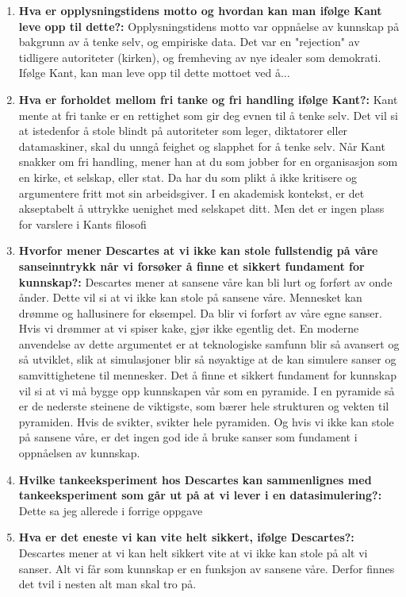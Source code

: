 \documentclass[11pt]{article}
\begin{document}
\begin{enumerate}
    \item \textbf{Hva er opplysningstidens motto og hvordan kan man ifølge Kant leve opp til dette?:} Opplysningstidens motto var oppnåelse av kunnskap på bakgrunn av å tenke selv, og empiriske data. Det var en "rejection" av tidligere autoriteter (kirken), og fremheving av nye idealer som demokrati. Ifølge Kant, kan man leve opp til dette mottoet ved å...
    \item \textbf{Hva er forholdet mellom fri tanke og fri handling ifølge Kant?:} Kant mente at fri tanke er en rettighet som gir deg evnen til å tenke selv. Det vil si at istedenfor å stole blindt på autoriteter som leger, diktatorer eller datamaskiner, skal du unngå feighet og slapphet for å tenke selv. Når Kant snakker om fri handling, mener han at du som jobber for en organisasjon som en kirke, et selskap, eller stat. Da har du som plikt å ikke kritisere og argumentere fritt mot sin arbeidsgiver. I en akademisk kontekst, er det akseptabelt å uttrykke uenighet med selskapet ditt. Men det er ingen plass for varslere i Kants filosofi
    \item \textbf{Hvorfor mener Descartes at vi ikke kan stole fullstendig på våre sanseinntrykk når vi forsøker å finne et sikkert fundament for kunnskap?:} Descartes mener at sansene våre kan bli lurt og forført av onde ånder. Dette vil si at vi ikke kan stole på sansene våre. Mennesket kan drømme og hallusinere for eksempel. Da blir vi forført av våre egne sanser. Hvis vi drømmer at vi spiser kake, gjør ikke egentlig det. En moderne anvendelse av dette argumentet er at teknologiske samfunn blir så avansert og så utviklet, slik at simulasjoner blir så nøyaktige at de kan simulere sanser  og samvittighetene til mennesker. Det å finne et sikkert fundament for kunnskap vil si at vi må bygge opp kunnskapen vår som en pyramide. I en pyramide så er de nederste steinene de viktigste, som bærer hele strukturen og vekten til pyramiden. Hvis de svikter, svikter hele pyramiden. Og hvis vi ikke kan stole på sansene våre, er det ingen god ide å bruke sanser som fundament i oppnåelsen av kunnskap.
    \item \textbf{Hvilke tankeeksperiment hos Descartes kan sammenlignes med tankeeksperiment som går ut på at vi lever i en datasimulering?:} Dette sa jeg allerede i forrige oppgave
    \item \textbf{Hva er det eneste vi kan vite helt sikkert, ifølge Descartes?:} Descartes mener at vi kan helt sikkert vite at vi ikke kan stole på alt vi sanser. Alt vi får som kunnskap er en funksjon av sansene våre. Derfor finnes det tvil i nesten alt man skal tro på.
\end{enumerate}
\end{document}
